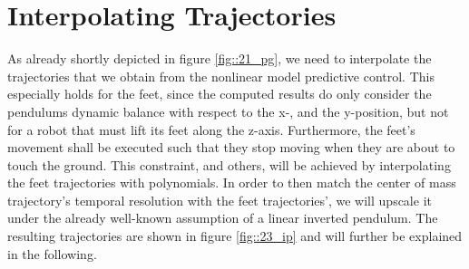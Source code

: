 \FloatBarrier
\section{Interpolating Trajectories}
\label{sec::23_it}
As already shortly depicted in figure \ref{fig::21_pg}, we need to interpolate the trajectories that we obtain from the nonlinear model predictive control. This especially holds for the feet, since the computed results do only consider the pendulums dynamic balance with respect to the x-, and the y-position, but not for a robot that must lift its feet along the z-axis. Furthermore, the feet's movement shall be executed such that they stop moving when they are about to touch the ground. This constraint, and others, will be achieved by interpolating the feet trajectories with polynomials. In order to then match the center of mass trajectory's temporal resolution with the feet trajectories', we will upscale it under the already well-known assumption of a linear inverted pendulum. The resulting trajectories are shown in figure \ref{fig::23_ip} and will further be explained in the following. 
